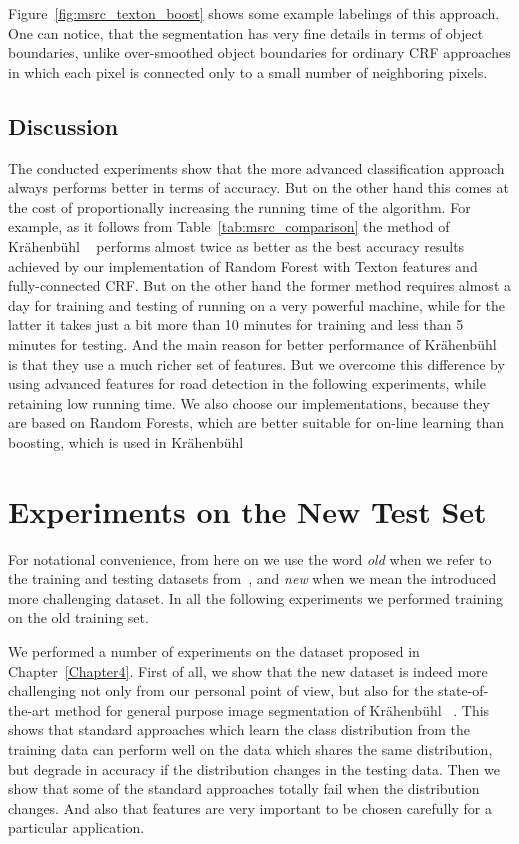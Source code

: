 Figure~\ref{fig:msrc_texton_boost} shows some example labelings of this approach. One can notice, that the segmentation has very fine details in terms of
object boundaries, unlike over-smoothed object boundaries for ordinary CRF approaches in which each pixel is connected only to a small number of
neighboring pixels.

\subsection{Discussion}

The conducted experiments show that the more advanced classification approach always performs better in terms of accuracy. But on the other hand
this comes at the cost of proportionally increasing the running time of the algorithm. For example, as it follows from Table~\ref{tab:msrc_comparison}
the method of Kr\"ahenb\"uhl \etal~\cite{Krahenbuhl2011} performs almost twice as better as the best accuracy results achieved by our implementation of
Random Forest with Texton features and fully-connected CRF. But on the other hand the former method requires almost a day for training and testing
of running on a very powerful machine, while for the latter it takes just a bit more than 10 minutes for training and less than 5 minutes for testing.
And the main reason for better performance of Kr\"ahenb\"uhl \etal~\cite{Krahenbuhl2011} is that they use a much richer set of features. But we overcome
this difference by using advanced features for road detection in the following experiments, while retaining low running time. We also choose our 
implementations, because they are based on Random Forests, which are better suitable for on-line learning than boosting, which is
used in Kr\"ahenb\"uhl \etal~\cite{Krahenbuhl2011}

\section{Experiments on the New Test Set}

For notational convenience, from here on we use the word \emph{old} when we refer to the training and testing datasets from~\cite{Wojek2008},
and \emph{new} when we mean the introduced more challenging dataset. In all the following experiments we performed training on the old  training set.

We performed a number of experiments on the dataset proposed in Chapter~\ref{Chapter4}. First of all, we show that the new dataset is indeed more
challenging not only from our personal point of view, but also for the state-of-the-art method for general purpose image segmentation of
Kr\"ahenb\"uhl \etal~\cite{Krahenbuhl2011}. This shows that standard approaches which learn the class distribution from the training data
can perform well on the data which shares the same distribution, but degrade in accuracy if the distribution changes in the testing data.
Then we show that some of the standard approaches totally fail when the distribution changes. And also that features are very important
to be chosen carefully for a particular application.


